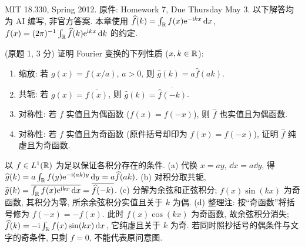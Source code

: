 MIT 18.330, Spring 2012. 原件: Homework 7, Due Thursday May 3. 以下解答均为 AI 编写, 非官方答案. 本章使用
$\widehat f(k)=\int_\mathbb R f(x)\mathrm e^{-\mathrm i kx}\,\mathrm d x$,
$f(x)=(2\pi)^{-1}\int_\mathbb R\widehat f(k)\mathrm e^{\mathrm i kx}\,\mathrm d k$ 的约定.

\begin{exercise}\label{ps7-q1}
(原题 1, 3 分) 证明 Fourier 变换的下列性质 ($x,k\in\mathbb R$):
\begin{enumerate}[label=(\alph*)]
\item 缩放: 若 $g(x)=f(x/a)$, $a>0$, 则 $\widehat g(k)=a\widehat f(ak)$.
\item 共轭: 若 $g(x)=\overline{f(x)}$, 则 $\widehat g(k)=\overline{\widehat f(-k)}$.
\item 对称性: 若 $f$ 实值且为偶函数 ($f(x)=f(-x)$), 则 $\widehat f$ 也实值且为偶函数.
\item 对称性: 若 $f$ 实值且为奇函数 (原件括号却印为 $f(x)=f(-x)$), 证明 $\widehat f$ 纯虚且为奇函数.
\end{enumerate}
\end{exercise}
\begin{solution}
以 $f\in L^1(\mathbb R)$ 为足以保证各积分存在的条件.
(a) 代换 $x=ay$, $\dd x=a\dd y$, 得
$\widehat g(k)=a\int_\mathbb R f(y)\mathrm e^{-\mathrm i(ak)y}\,\mathrm d y=a\widehat f(ak)$.
(b) 对积分取共轭,
$\widehat g(k)=\overline{\int_\mathbb R f(x)\mathrm e^{\mathrm i kx}\,\mathrm d x}=\overline{\widehat f(-k)}$.
(c) 分解为余弦和正弦积分; $f(x)\sin(kx)$ 为奇函数, 其积分为零, 所余余弦积分实值且关于 $k$ 为偶.
(d) 整理注: 按“奇函数”将括号修为 $f(-x)=-f(x)$. 此时 $f(x)\cos(kx)$ 为奇函数, 故余弦积分消失;
$\widehat f(k)=-\mathrm i\int_\mathbb R f(x)\sin(kx)\,\mathrm d x$, 它纯虚且关于 $k$ 为奇. 若同时照抄括号的偶条件与文字的奇条件, 只剩 $f=0$, 不能代表原问意图.
\end{solution}

